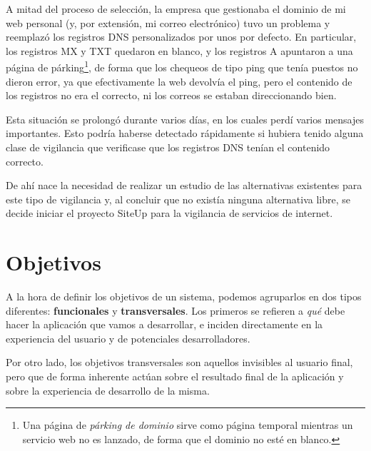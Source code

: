 A mitad del proceso de selección, la empresa que gestionaba el dominio de mi web
personal (y, por extensión, mi correo electrónico) tuvo un problema y reemplazó
los registros DNS personalizados por unos por defecto. En particular, los
registros MX y TXT quedaron en blanco, y los registros A apuntaron a una página
de párking\footnote{Una página de \textit{párking de dominio} sirve como página
  temporal mientras un servicio web no es lanzado, de forma que el dominio no esté
  en blanco.}, de forma que los chequeos de tipo ping que tenía puestos no
dieron error, ya que efectivamente la web devolvía el ping, pero el contenido de
los registros no era el correcto, ni los correos se estaban direccionando bien.

Esta situación se prolongó durante varios días, en los cuales perdí varios
mensajes importantes. Esto podría haberse detectado rápidamente si hubiera tenido
alguna clase de vigilancia que verificase que los registros DNS tenían el
contenido correcto. 

De ahí nace la necesidad de realizar un estudio de las alternativas existentes
para este tipo de vigilancia y, al concluir que no existía ninguna alternativa
libre, se decide iniciar el proyecto SiteUp para la vigilancia de servicios de
internet.


\section{Objetivos}
\label{sec:objetivos}

A la hora de definir los objetivos de un sistema, podemos agruparlos
en dos tipos diferentes: \textbf{funcionales} y
\textbf{transversales}. Los primeros se refieren a \textit{qué} debe
hacer la aplicación que vamos a desarrollar, e inciden
directamente en la experiencia del usuario y de potenciales
desarrolladores.

Por otro lado, los objetivos transversales son aquellos invisibles al
usuario final, pero que de forma inherente actúan sobre el resultado
final de la aplicación y sobre la experiencia de desarrollo de la misma.

